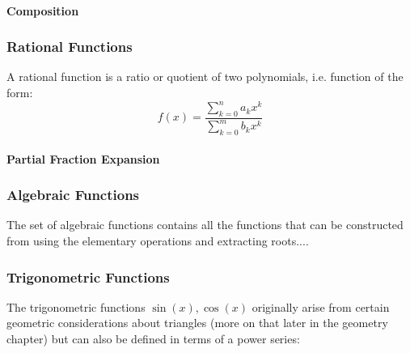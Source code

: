\paragraph{Composition}



\subsubsection{Rational Functions}
A rational function is a ratio or quotient of two polynomials, i.e. function of the form:
\begin{equation}
 f(x) = \frac{\sum_{k=0}^n a_k x^k}{\sum_{k=0}^m b_k x^k}
\end{equation}

\paragraph{Partial Fraction Expansion}



\subsubsection{Algebraic Functions}
The set of algebraic functions contains all the functions that can be constructed from using the elementary operations and extracting roots....

\subsubsection{Trigonometric Functions}
The trigonometric functions $\sin(x), \cos(x)$ originally arise from certain geometric considerations about triangles (more on that later in the geometry chapter) but can also be defined in terms of a power series:






